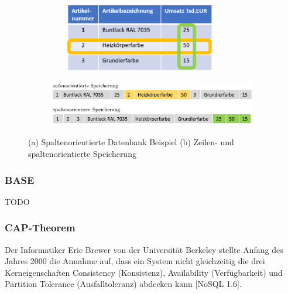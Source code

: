 \begin{figure}[tbt]
	\begin{subfigure}{\textwidth}
		\centering
		\includegraphics[width=8cm, height = 3cm]{images/SpaltenorientiereDatenbank.png}
		\caption{}
		\label{fig:spalten_zeilen_speicher}
	\end{subfigure}
	\newline
	\begin{subfigure}{\textwidth}
		\centering
		\includegraphics[width=15cm]{images/zeilenspaltenorientiert.png}
		\caption{ }
		\label{fig:spalten_zeilen}
	\end{subfigure}
	\caption[Zeilen- und spaltenorientierte Speicherung]{(a) Spaltenorientierte Datenbank Beispiel (b) Zeilen- und spaltenorientierte Speicherung \protect \footnotemark}
\end{figure}

\subsubsection{BASE}
TODO
\newline

\subsubsection{CAP-Theorem}
Der Informatiker Eric Brewer von der Universität Berkeley stellte Anfang des Jahres 2000 die Annahme auf, dass ein System nicht gleichzeitig die drei Kerneigenschaften Consistency (Konsistenz), Availability (Verfügbarkeit) und Partition Tolerance (Ausfalltoleranz) abdecken kann [NoSQL 1.6]. 
\newline

